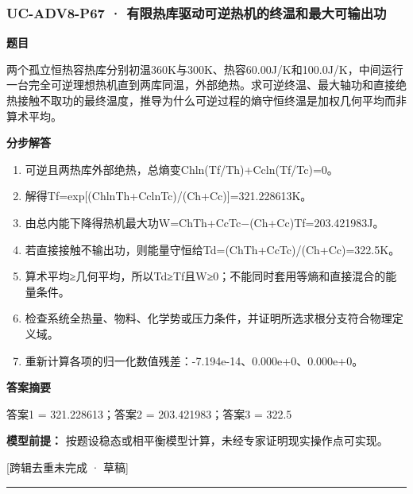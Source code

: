 \documentclass[UTF8,11pt,a4paper]{ctexart}
\begin{document}
\subsubsection*{UC-ADV8-P67 · 有限热库驱动可逆热机的终温和最大可输出功}
\noindent\textbf{题目}\par
两个孤立恒热容热库分别初温360K与300K、热容60.00J/K和100.0J/K，中间运行一台完全可逆理想热机直到两库同温，外部绝热。求可逆终温、最大轴功和直接绝热接触不取功的最终温度，推导为什么可逆过程的熵守恒终温是加权几何平均而非算术平均。\par
\medskip\noindent\textbf{分步解答}
\begin{enumerate}
\item 可逆且两热库外部绝热，总熵变Chln(Tf/Th)+Ccln(Tf/Tc)=0。
\item 解得Tf=exp[(ChlnTh+CclnTc)/(Ch+Cc)]=321.228613K。
\item 由总内能下降得热机最大功W=ChTh+CcTc−(Ch+Cc)Tf=203.421983J。
\item 若直接接触不输出功，则能量守恒给Td=(ChTh+CcTc)/(Ch+Cc)=322.5K。
\item 算术平均≥几何平均，所以Td≥Tf且W≥0；不能同时套用等熵和直接混合的能量条件。
\item 检查系统全热量、物料、化学势或压力条件，并证明所选求根分支符合物理定义域。
\item 重新计算各项的归一化数值残差：-7.194e-14、0.000e+0、0.000e+0。
\end{enumerate}
\noindent\textbf{答案摘要}\par
答案1 = 321.228613；答案2 = 203.421983；答案3 = 322.5\par
\noindent\textbf{模型前提：}
按题设稳态或相平衡模型计算，未经专家证明现实操作点可实现。\par
\noindent\textcolor{red!65!black}{[跨辑去重未完成 · 草稿]} \par
\medskip\hrule\medskip
{}
\end{document}
